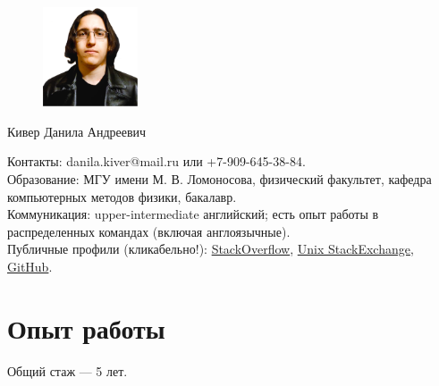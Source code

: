 \documentclass[letterpaper, 11pt]{article}
\begin{document}
    \begin{figure}
        \centering
        \vspace{-5pt}
        \includegraphics[width=0.25\textwidth]{src/images/pho_small_cut.png}
    \end{figure}

    \noindent
    \Huge
    Кивер Данила Андреевич \\
    \normalsize

    \noindent
    Контакты: danila.kiver@mail.ru или +7-909-645-38-84. \\

    \noindent
    Образование: МГУ имени М. В. Ломоносова, физический факультет, кафедра компьютерных методов физики, бакалавр. \\

    \noindent
    Коммуникация: upper-intermediate английский; есть опыт работы в распределенных командах (включая англоязычные). \\

    \noindent
    Публичные профили (кликабельно!): \href{https://stackoverflow.com/users/7191047/danila-kiver}{StackOverflow}, \href{https://unix.stackexchange.com/users/297621/danila-kiver}{Unix StackExchange}, \href{https://github.com/QazerLab}{GitHub}.





    \section{Опыт работы}

    Общий стаж --- 5 лет.
\end{document}

